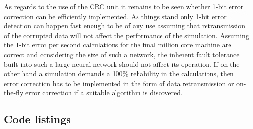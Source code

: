 \documentclass[oneside, a4paper, 11pt]{memoir}
\begin{document}
As regards to the use of the CRC unit it remains to be seen whether 1-bit error correction can be efficiently implemented. As things stand only 1-bit error detection can happen fast enough to be of any use assuming that retransmission of the corrupted data will not affect the performance of the simulation. Assuming the 1-bit error per second calculations for the final million core machine are correct and considering the size of such a network, the inherent fault tolerance built into such a large neural network should not affect its operation. If on the other hand a simulation demands a 100\% reliability in the calculations, then error correction has to be implemented in the form of data retransmission or on-the-fly error correction if a suitable algorithm is discovered.

\begin{appendices}

\chapter{Code listings}
\inputminted[fontsize=\tiny]{python}{code/bursting.py}
\end{appendices}



\end{document}
